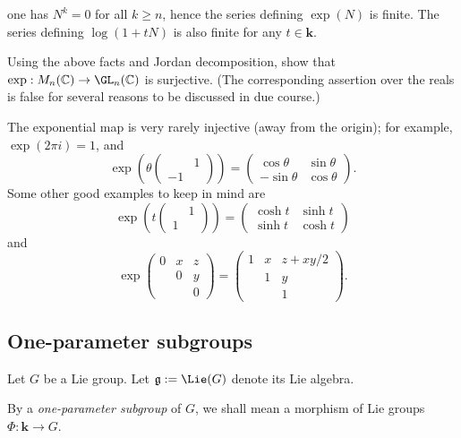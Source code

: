 \documentclass[reqno]{amsart} 
\begin{document}
one has $N^k = 0$ for all $k \geq n$,
hence the series defining $\exp(N)$ is finite.
The series defining $\log(1 + t N)$ is also finite for any $t
\in \mathbf{k}$.
\begin{exercise}
 Using the above facts and Jordan decomposition,
show that
$\exp : M_n(\mathbb{C}) \rightarrow \GL_n(\mathbb{C})$ is
surjective. 
(The corresponding assertion over the reals is false
for several reasons to be discussed in due course.)
\end{exercise}
The exponential map is very rarely injective (away from the
origin);
for example,
$\exp(2 \pi i) = 1$,
and
\begin{equation*}
  \exp (\theta 
\begin{pmatrix}
     & 1 \\
    -1 & 
  \end{pmatrix}
)
  = 
\begin{pmatrix}
    \cos \theta  &  \sin \theta  \\
    - \sin \theta  & \cos \theta 
  \end{pmatrix}
.
\end{equation*}
Some other good examples to keep in mind are
\begin{equation*}
  \exp (t 
\begin{pmatrix}
     & 1 \\
    1 & 
  \end{pmatrix}
)
  = 
\begin{pmatrix}
    \cosh t  &  \sinh t  \\
    \sinh t  & \cosh t 
  \end{pmatrix}
\end{equation*}
and
\begin{equation*}
  \exp 
\begin{pmatrix}
    0 & x & z \\
     & 0 & y \\
     &  & 0
   \end{pmatrix}
   =
   \begin{pmatrix}
     1 & x & z + x y/2 \\
      & 1 & y \\
      &  & 1
   \end{pmatrix}
.
 \end{equation*}

\subsection{One-parameter subgroups\label{sec:one-param-subgps}}
\label{sec:org964bb98}
Let $G$ be a Lie group.  Let $\mathfrak{g} := \Lie(G)$
denote its Lie algebra.
\begin{definition}
  By a \emph{one-parameter subgroup} of
  $G$, we shall mean a morphism of Lie groups
  $\Phi : \mathbf{k} \rightarrow G$.
\end{definition}
\end{document}
